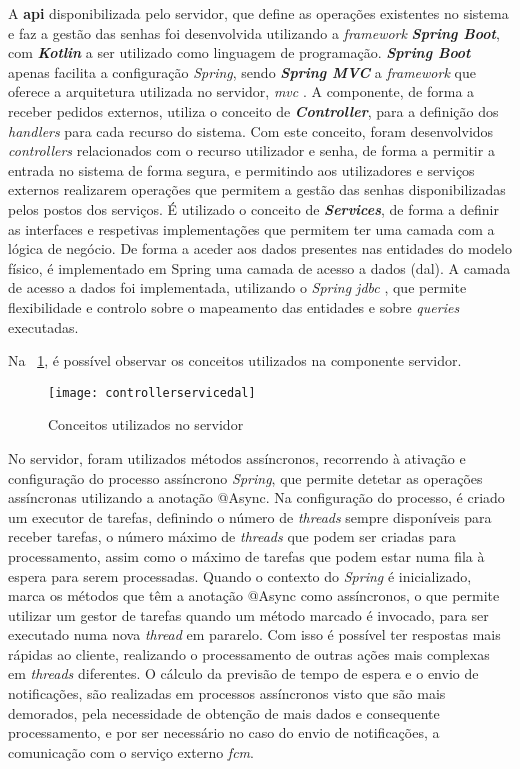{A \textbf{\acrfull{api}} disponibilizada pelo servidor, que define as operações existentes no sistema e faz a gestão das senhas foi desenvolvida utilizando a \textit{framework} \textbf{\textit{Spring Boot}}, com \textbf{\textit{Kotlin}} a ser utilizado como linguagem de programação. \textbf{\textit{Spring Boot}} apenas facilita a configuração \textit{Spring}, sendo \textbf{\textit{Spring MVC}} \cite{springmvc} a \textit{framework} que oferece a arquitetura utilizada no servidor, \textit{\acrfull{mvc}} \cite{mvc}.
A componente, de forma a receber pedidos externos, utiliza o conceito de \textbf{\textit{Controller}}, para a definição dos \textit{handlers} para cada recurso do sistema. Com este conceito, foram desenvolvidos \textit{controllers} relacionados com o recurso utilizador e senha, de forma a permitir a entrada no sistema de forma segura, e permitindo aos utilizadores e serviços externos realizarem operações que permitem a gestão das senhas disponibilizadas pelos postos dos serviços. 
É utilizado o conceito de \textbf{\textit{Services}}, de forma a definir as interfaces e respetivas implementações que permitem ter uma camada com a lógica de negócio. De forma a aceder aos dados presentes nas entidades do modelo físico, é implementado em Spring uma camada de acesso a dados (\acrshort{dal}). A camada de acesso a dados foi implementada, utilizando o \textit{Spring \acrfull{jdbc}} \cite{jdbc}, que permite flexibilidade e controlo sobre o mapeamento das entidades e sobre \textit{queries} executadas. 

Na \figurename~\ref{fig:controllerservicedal_s}, é possível observar os conceitos utilizados na componente servidor.

\begin{figure}[ht]
    \centering
    \texttt{[image: controllerservicedal]}
      \caption{Conceitos utilizados no servidor}
  \label{fig:controllerservicedal_s}
\end{figure}


No servidor, foram utilizados métodos assíncronos, recorrendo à ativação e configuração do processo assíncrono \textit{Spring}, que permite detetar as operações assíncronas utilizando a anotação @Async. Na configuração do processo, é criado um executor de tarefas, definindo o número de \textit{threads} sempre disponíveis para receber tarefas, o número máximo de \textit{threads} que podem ser criadas para processamento, assim como o máximo de tarefas que podem estar numa fila à espera para serem processadas. Quando o contexto do \textit{Spring} é inicializado, marca os métodos que têm a anotação @Async como assíncronos, o que permite utilizar um gestor de tarefas quando um método marcado é invocado, para ser executado numa nova \textit{thread} em pararelo. Com isso é possível ter respostas mais rápidas ao cliente, realizando o processamento de outras ações mais complexas em \textit{threads} diferentes. O cálculo da previsão de tempo de espera e o envio de notificações, são realizadas em processos assíncronos visto que são mais demorados, pela necessidade de obtenção de mais dados e consequente processamento, e por ser necessário no caso do envio de notificações, a comunicação com o serviço externo \textit{\acrshort{fcm}}.

}
